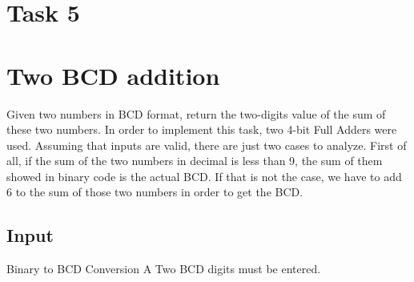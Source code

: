 

\section*{Task 5}




\section{Two BCD addition}
Given two numbers in BCD format, return the two-digits value of the sum of these two numbers.
In order to implement this task, two 4-bit Full Adders were used.
Assuming that inputs are valid, there are just two cases to analyze. 
First of all, if the sum of the two numbers in decimal is less than 9, the sum of them showed in binary code is the actual BCD.
If that is not the case, we have to add 6 to the sum of those two numbers in order to get the BCD.


\subsection{Input}Binary to BCD Conversion A
Two BCD digits must be entered. 

